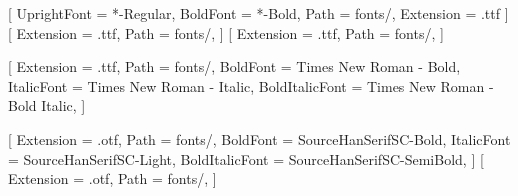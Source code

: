 \usepackage{fontspec}
\newfontfamily{}[
  UprightFont = *-Regular,
  BoldFont    = *-Bold,
  Path        = fonts/,
  Extension   = .ttf
]
\newfontface{}[
  Extension = .ttf,
  Path      = fonts/,
]
\newfontface{}[
    Extension = .ttf,
    Path      = fonts/,
]

\setmainfont{Times New Roman}[
  Extension       = .ttf,
  Path            = fonts/,
  BoldFont        = Times New Roman - Bold,
  ItalicFont      = Times New Roman - Italic,
  BoldItalicFont  = Times New Roman - Bold Italic,
]

\usepackage{xeCJK}
[
  Extension       = .otf,
  Path            = fonts/,
  BoldFont        = SourceHanSerifSC-Bold,
  ItalicFont      = SourceHanSerifSC-Light,
  BoldItalicFont  = SourceHanSerifSC-SemiBold,
]
[
  Extension   = .otf,
  Path        = fonts/,
]

